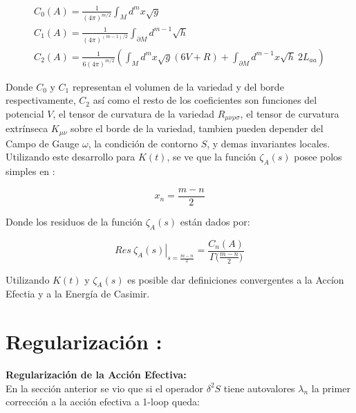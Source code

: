 \begin{equation}
\begin{array}{c}
C _0 (A) = \frac{1}{(4 \pi ) ^{m/2} }  \int  _{M} d ^m x \sqrt{g}  \\[10pt]
C _1 (A) = \frac{ 1 }{(4 \pi ) ^{(m-1)/2} } \int _{\partial M } d ^{m-1} \sqrt{h} \\[10pt]
C _2 (A) = \frac{ 1 }{6 (4 \pi) ^{m/2} } \left(
									\int _M d ^m x\sqrt{g} (6 V + R) +
									\int _{\partial M } d ^{m-1} x 
									\sqrt{h} \ 2 L _{aa} 
									\right)
\end{array}
\end{equation} 

Donde $C _0$ y $C _1$ representan el volumen de la variedad y del borde respectivamente, $C _2$ así como el resto de los coeficientes son funciones del potencial $V$, el tensor de curvatura de la variedad $R _{\mu \nu \rho \sigma }$, el tensor de curvatura extrínseca $K _{\mu \nu }$ sobre el borde de la variedad, tambien pueden depender del Campo de Gauge $\omega $, la condición de contorno $S$, y demas invariantes locales.  \\


Utilizando este desarrollo para $K(t)$, se ve que la función $\zeta _A (s)$ posee polos simples en :


\begin{equation}
x _n = \frac{m-n}{2} 
\label{eq.ceros.zeta}
\end{equation}


Donde los residuos de la función $\zeta _A (s) $ están dados por:

\begin{equation}
\left. Res \ \zeta _A (s)  \right| _{s= \frac{m - n}{2}} =  
\frac{ C_n  (A) }{ {\Gamma ( \frac{m-n}{2}} ) }
\end{equation}


Utilizando $K(t)$ y $\zeta _A (s) $ es posible dar definiciones convergentes a la Accíon Efectia y a la Energía de Casimir.




\section{Regularización :}

\textbf{Regularización de la Acción Efectiva:} \\

En la sección anterior se vio que si el operador $\delta ^2 S$ tiene autovalores $\lambda _n$ la primer corrección a la acción efectiva a 1-loop queda:

